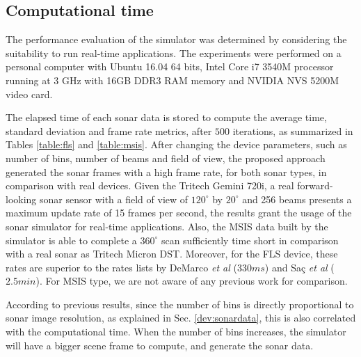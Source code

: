 \documentclass[final,5p,times]{elsarticle}
\begin{document}
\subsection{Computational time}

The performance evaluation of the simulator was determined by considering the suitability to run real-time applications. The experiments were performed on a personal computer with Ubuntu 16.04 64 bits, Intel Core i7 3540M processor running at 3 GHz with 16GB DDR3 RAM memory and NVIDIA NVS 5200M video card.

The elapsed time of each sonar data is stored to compute the average time, standard deviation and frame rate metrics, after $500$ iterations, as summarized in Tables \ref{table:fls} and \ref{table:msis}. After changing the device parameters, such as number of bins, number of beams and field of view, the proposed approach generated the sonar frames with a high frame rate, for both sonar types, in comparison with real devices. Given the Tritech Gemini 720i, a real forward-looking sonar sensor with a field of view of $120^{\circ}$ by $20^{\circ}$ and 256 beams presents a maximum update rate of 15 frames per second, the results grant the usage of the sonar simulator for real-time applications. Also, the MSIS data built by the simulator is able to complete a $360^{\circ}$ scan sufficiently time short in comparison with a real sonar as Tritech Micron DST. Moreover, for the FLS device, these rates are superior to the rates lists by DeMarco \textit{et al} \cite{demarco2015} ($330 ms$) and Saç \textit{et al} \cite{sac2015} ($2.5 min$). For MSIS type, we are not aware of any previous work for comparison.  

According to previous results, since the number of bins is directly proportional to sonar image resolution, as explained in Sec. \ref{dev:sonardata}, this is also correlated with the computational time. When the number of bins increases, the simulator will have a bigger scene frame to compute, and generate the sonar data.
\end{document}
